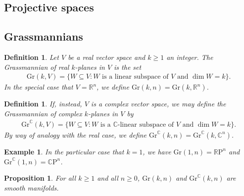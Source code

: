 \documentclass{amsart}          %
\newtheorem{proposition}[theorem]{Proposition}
\newtheorem{definition}[theorem]{Definition}
\newtheorem{example}[theorem]{Example}
\newcommand{\R}{\mathbb R}
\newcommand{\C}{\mathbb C}
\newcommand{\RP}{\mathbb{R}\mathrm{P}}
\newcommand{\CP}{\mathbb{C}\mathrm{P}}
\newcommand{\Gr}{\mathrm{Gr}}
\begin{document}
\subsection{Projective spaces}

\subsection{Grassmannians}

\begin{definition}
	Let $V$ be a real vector space and $k\geq 1$ an integer. The \textit{Grassmannian of real $k$-planes in $V$} is the set\begin{align*}
	\Gr(k,V)=\{W\subseteq V:\text{$W$ is a linear subspace of $V$ and $\dim W=k$}\}.
	\end{align*}
	In the special case that $V=\R^n$, we define $\Gr(k,n)=\Gr(k,\R^n)$.
\end{definition}
\begin{definition}
	If, instead, $V$ is a \textit{complex} vector space, we may define the \textit{Grassmannian of complex $k$-planes in $V$} by\begin{align*}
	\Gr^\C(k,V)=\{W\subseteq V:\text{$W$ is a $\C$-linear subspace of $V$ and $\dim W=k$}\}.
	\end{align*}
	By way of analogy with the real case, we define $\Gr^\C(k,n)=\Gr^\C(k,\C^n)$.
\end{definition}
\begin{example}
	In the particular case that $k=1$, we have $\Gr(1,n)=\RP^n$ and $\Gr^\C(1,n)=\CP^n$.
\end{example}
\begin{proposition}
	For all $k\geq 1$ and all $n\geq 0$, $\Gr(k,n)$ and $\Gr^\C(k,n)$ are smooth manifolds.
\end{proposition}
\end{document}
